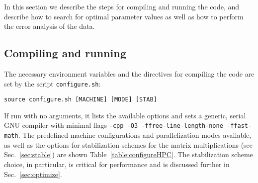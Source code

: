 


In this section we describe the steps for compiling and running the code, and describe how to search for optimal parameter values as well as how to perform the error analysis of the data.

\subsection{Compiling and running}
\label{sec:compilation}

The necessary environment variables and the directives for compiling the code are set by the script \texttt{configure.sh}:
\begin{lstlisting}[style=bash]
source configure.sh [MACHINE] [MODE] [STAB]
\end{lstlisting}
If run with no arguments, it lists the available options and sets a generic, serial GNU compiler with minimal flags \texttt{-cpp -O3 -ffree-line-length-none -ffast-math}. The predefined machine configurations and parallelization modes available, as well as the options for stabilization schemes for the matrix multiplications (see Sec.~\ref{sec:stable}) are shown Table~\ref{table:configureHPC}. The stabilization scheme choice, in particular, is critical for performance and is discussed further in Sec.~\ref{sec:optimize}.

